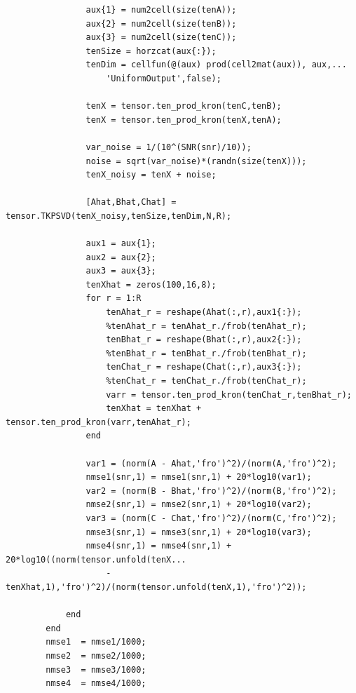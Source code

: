 \documentclass[a4paper,10pt]{article}
\begin{document}
\begin{verbatim}
                aux{1} = num2cell(size(tenA));
                aux{2} = num2cell(size(tenB));
                aux{3} = num2cell(size(tenC));
                tenSize = horzcat(aux{:});
                tenDim = cellfun(@(aux) prod(cell2mat(aux)), aux,...
                    'UniformOutput',false);

                tenX = tensor.ten_prod_kron(tenC,tenB);
                tenX = tensor.ten_prod_kron(tenX,tenA);
                
                var_noise = 1/(10^(SNR(snr)/10));
                noise = sqrt(var_noise)*(randn(size(tenX)));
                tenX_noisy = tenX + noise;
                
                [Ahat,Bhat,Chat] = tensor.TKPSVD(tenX_noisy,tenSize,tenDim,N,R);

                aux1 = aux{1};
                aux2 = aux{2};
                aux3 = aux{3};
                tenXhat = zeros(100,16,8);
                for r = 1:R
                    tenAhat_r = reshape(Ahat(:,r),aux1{:});
                    %tenAhat_r = tenAhat_r./frob(tenAhat_r);
                    tenBhat_r = reshape(Bhat(:,r),aux2{:});
                    %tenBhat_r = tenBhat_r./frob(tenBhat_r);
                    tenChat_r = reshape(Chat(:,r),aux3{:});
                    %tenChat_r = tenChat_r./frob(tenChat_r);
                    varr = tensor.ten_prod_kron(tenChat_r,tenBhat_r);
                    tenXhat = tenXhat + tensor.ten_prod_kron(varr,tenAhat_r);
                end
                
                var1 = (norm(A - Ahat,'fro')^2)/(norm(A,'fro')^2);
                nmse1(snr,1) = nmse1(snr,1) + 20*log10(var1);
                var2 = (norm(B - Bhat,'fro')^2)/(norm(B,'fro')^2);
                nmse2(snr,1) = nmse2(snr,1) + 20*log10(var2);
                var3 = (norm(C - Chat,'fro')^2)/(norm(C,'fro')^2);
                nmse3(snr,1) = nmse3(snr,1) + 20*log10(var3);
                nmse4(snr,1) = nmse4(snr,1) + 20*log10((norm(tensor.unfold(tenX...
                    - tenXhat,1),'fro')^2)/(norm(tensor.unfold(tenX,1),'fro')^2));
                
            end
        end
        nmse1  = nmse1/1000;
        nmse2  = nmse2/1000;
        nmse3  = nmse3/1000;
        nmse4  = nmse4/1000;


\end{verbatim}
\end{document}
